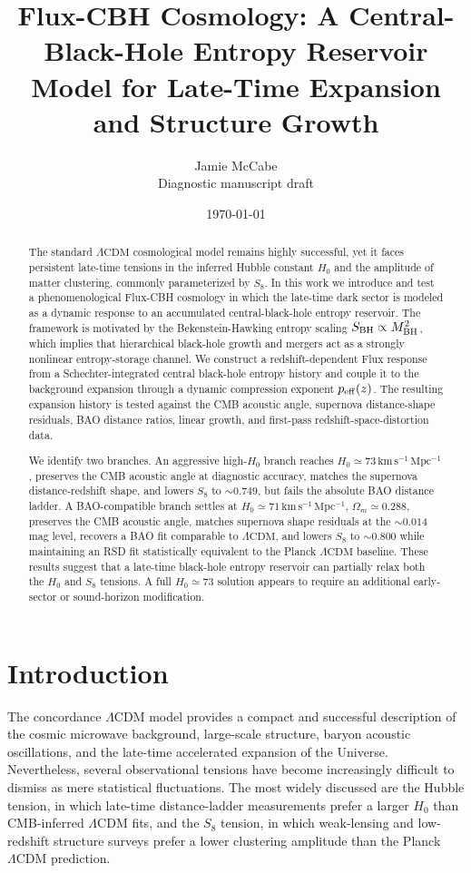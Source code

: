 \documentclass[11pt,a4paper]{article}
\title{\textbf{Flux-CBH Cosmology: A Central-Black-Hole Entropy Reservoir Model for Late-Time Expansion and Structure Growth}}
\author{Jamie McCabe\\\small Diagnostic manuscript draft}
\date{\today}
\newcommand{\LCDM}{\ensuremath{\Lambda\mathrm{CDM}}}
\newcommand{\kmsmpc}{\ensuremath{\mathrm{km\,s^{-1}\,Mpc^{-1}}}}
\begin{document}
\maketitle

\begin{abstract}
The standard \LCDM{} cosmological model remains highly successful, yet it faces persistent late-time tensions in the inferred Hubble constant $H_0$ and the amplitude of matter clustering, commonly parameterized by $S_8$. In this work we introduce and test a phenomenological Flux-CBH cosmology in which the late-time dark sector is modeled as a dynamic response to an accumulated central-black-hole entropy reservoir. The framework is motivated by the Bekenstein-Hawking entropy scaling $S_{\rm BH}\propto M_{\rm BH}^2$, which implies that hierarchical black-hole growth and mergers act as a strongly nonlinear entropy-storage channel. We construct a redshift-dependent Flux response from a Schechter-integrated central black-hole entropy history and couple it to the background expansion through a dynamic compression exponent $p_{\rm eff}(z)$. The resulting expansion history is tested against the CMB acoustic angle, supernova distance-shape residuals, BAO distance ratios, linear growth, and first-pass redshift-space-distortion data.

We identify two branches. An aggressive high-$H_0$ branch reaches $H_0\simeq73\,\kmsmpc$, preserves the CMB acoustic angle at diagnostic accuracy, matches the supernova distance-redshift shape, and lowers $S_8$ to $\sim0.749$, but fails the absolute BAO distance ladder. A BAO-compatible branch settles at $H_0\simeq71\,\kmsmpc$, $\Omega_m\simeq0.288$, preserves the CMB acoustic angle, matches supernova shape residuals at the $\sim0.014$ mag level, recovers a BAO fit comparable to \LCDM{}, and lowers $S_8$ to $\sim0.800$ while maintaining an RSD fit statistically equivalent to the Planck \LCDM{} baseline. These results suggest that a late-time black-hole entropy reservoir can partially relax both the $H_0$ and $S_8$ tensions. A full $H_0\simeq73$ solution appears to require an additional early-sector or sound-horizon modification.
\end{abstract}

\section{Introduction}

The concordance \LCDM{} model provides a compact and successful description of the cosmic microwave background, large-scale structure, baryon acoustic oscillations, and the late-time accelerated expansion of the Universe. Nevertheless, several observational tensions have become increasingly difficult to dismiss as mere statistical fluctuations. The most widely discussed are the Hubble tension, in which late-time distance-ladder measurements prefer a larger $H_0$ than CMB-inferred \LCDM{} fits, and the $S_8$ tension, in which weak-lensing and low-redshift structure surveys prefer a lower clustering amplitude than the Planck \LCDM{} prediction.
\end{document}
